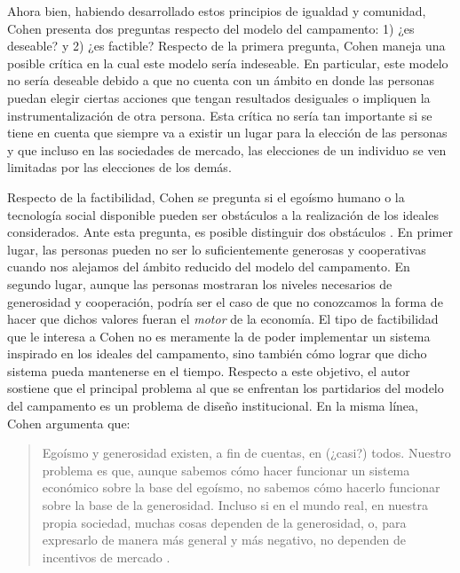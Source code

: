 Ahora bien, habiendo desarrollado estos principios de igualdad y comunidad, Cohen presenta dos preguntas respecto del modelo del campamento: 1) ¿es deseable? y 2) ¿es factible? Respecto de la primera pregunta, Cohen maneja una posible crítica en la cual este modelo sería indeseable. En particular, este modelo no sería deseable debido a que no cuenta con un ámbito en donde las personas puedan elegir ciertas acciones que tengan resultados desiguales o impliquen la instrumentalización de otra persona. Esta crítica no sería tan importante si se tiene en cuenta que siempre va a existir un lugar para la elección de las personas y que incluso en las sociedades de mercado, las elecciones de un individuo se ven limitadas por las elecciones de los demás.

Respecto de la factibilidad, Cohen se pregunta si el egoísmo humano o la tecnología social disponible pueden ser obstáculos a la realización de los ideales considerados. Ante esta pregunta, es posible distinguir dos obstáculos \citep{Cohen_2014c}. En primer lugar, las personas pueden no ser lo suficientemente generosas y cooperativas cuando nos alejamos del ámbito reducido del modelo del campamento. En segundo lugar, aunque las personas mostraran los niveles necesarios de generosidad y cooperación, podría ser el caso de que no conozcamos la forma de hacer que dichos valores fueran el \textit{motor} de la economía. El tipo de factibilidad que le interesa a Cohen no es meramente la de poder implementar un sistema inspirado en los ideales del campamento, sino también cómo lograr que dicho sistema pueda mantenerse en el tiempo. Respecto a este objetivo, el autor sostiene que el principal problema al que se enfrentan los partidarios del modelo del campamento es un problema de diseño institucional. En la misma línea, Cohen argumenta que:  

\vspace{3mm}
\begin{quote}
    Egoísmo y generosidad existen, a fin de cuentas, en (¿casi?) todos. Nuestro problema es que, aunque sabemos cómo hacer funcionar un sistema económico sobre la base del egoísmo, no sabemos cómo hacerlo funcionar sobre la base de la generosidad. Incluso si en el mundo real, en nuestra propia sociedad, muchas cosas dependen de la generosidad, o, para expresarlo de manera más general y más negativo, no dependen de incentivos de mercado \citep[p. 199]{Cohen_2014c}.
\end{quote}
\vspace{3mm}

